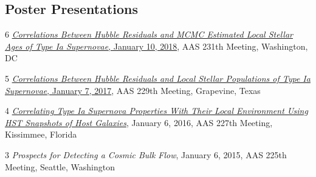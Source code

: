 \documentclass[margin]{res}
\begin{document}
\begin{resume}









\section{Poster Presentations}


\hangindent=15pt {\footnotesize \textcolor{light-gray}{6}} \href{https://ui.adsabs.harvard.edu/#abs/2018AAS...23124512R/abstract}{{\sl Correlations Between Hubble Residuals and MCMC Estimated Local Stellar Ages of Type Ia Supernovae}, January 10, 2018}, AAS 231th Meeting, Washington, DC
\vspace{-12pt}


\hangindent=15pt {\footnotesize \textcolor{light-gray}{5}} \href{https://ui.adsabs.harvard.edu/#abs/2017AAS...22943402R/abstract}{{\sl Correlations Between Hubble Residuals and Local Stellar Populations of Type Ia Supernovae}, January 7, 2017}, AAS 229th Meeting, Grapevine, Texas
\vspace{-12pt}

\hangindent=15pt {\footnotesize \textcolor{light-gray}{4}} \href{https://ui.adsabs.harvard.edu/#abs/2016AAS...22723711R/abstract}{{\sl Correlating Type Ia Supernova Properties With Their Local Environment Using HST Snapshots of Host Galaxies}}, January 6, 2016, AAS 227th Meeting, Kissimmee, Florida
\vspace{-12pt}

\hangindent=15pt {\footnotesize \textcolor{light-gray}{3}} 
{\sl Prospects for Detecting a Cosmic Bulk Flow},  January 6, 2015, AAS 225th Meeting, Seattle, Washington 
\vspace{-12pt}


\end{resume}
\end{document}
